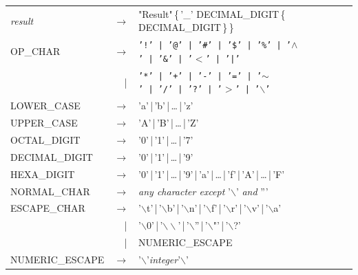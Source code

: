 \documentclass[11pt]{mybook}
\begin{document}
{\begin{tabular}{lrl}
{\it{}result}      & $\rightarrow$ & "Result"\,\{\,'\_' DECIMAL\_DIGIT\,\{\,DECIMAL\_DIGIT\,\}\,\}\\

OP\_CHAR      & $\rightarrow$ & {\tt '!'\,|\,'@'\,|\,'\#'\,|\,'\$'\,|\,'\%'\,|\,'$\wedge$'\,|\,'\&'\,|\,'$<$'\,|\,'|'} \\
              & |\,       & {\tt '*'\,|\,'+'\,|\,'-'\,|\,'='\,|\,'$\sim$'\,|\,'/'\,|\,'?'\,|\,'$>$'\,|\,'$\backslash$'}\\

LOWER\_CASE   & $\rightarrow$ & 'a'\,|\,'b'\,|\,\ldots\,|\,'z'\\

UPPER\_CASE   & $\rightarrow$ & 'A'\,|\,'B'\,|\,\ldots\,|\,'Z'\\

OCTAL\_DIGIT  & $\rightarrow$ & '0'\,|\,'1'\,|\,\ldots\,|\,'7'\\

DECIMAL\_DIGIT& $\rightarrow$ & '0'\,|\,'1'\,|\,\ldots\,|\,'9'\\

HEXA\_DIGIT   & $\rightarrow$ & '0'\,|\,'1'\,|\,\ldots\,|\,'9'\,|\,'a'\,|\,\ldots\,|\,'f'\,|\,'A'\,|\,\ldots\,|\,'F'\\

NORMAL\_CHAR  & $\rightarrow$ & {\it{}any character except} '$\backslash$' {\it{}and} '''\\

ESCAPE\_CHAR  & $\rightarrow$ & '$\backslash$t'\,|\,'$\backslash$b'\,|\,'$\backslash$n'\,|\,'$\backslash$f'\,|\,'$\backslash$r'\,|\,'$\backslash$v'\,|\,'$\backslash$a'\\
              & |\,           & '$\backslash$0'\,|\,'$\backslash\backslash$'\,|\,'$\backslash$''\,|\,'$\backslash$"'\,|\,'$\backslash$?'\\
              & |\,           & NUMERIC\_ESCAPE\\

NUMERIC\_ESCAPE & $\rightarrow$ & '$\backslash$'{\it{}integer}'$\backslash$'\\

\end{tabular}}
\noindent
\end{document}
